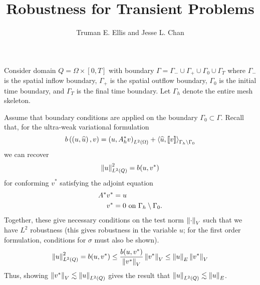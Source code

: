 \documentclass{article}
\title{Robustness for Transient Problems}
\author{Truman E. Ellis and Jesse L. Chan}
\begin{document}
\maketitle

Consider domain $Q=\Omega\times[0,T]$ with boundary $\Gamma=\Gamma_-\cup\Gamma_+\cup\Gamma_0\cup\Gamma_T$ 
where $\Gamma_-$ is the spatial inflow boundary, $\Gamma_+$ is the spatial outflow boundary, $\Gamma_0$ is the initial time boundary, 
and $\Gamma_T$ is the final time boundary. Let $\Gamma_h$ denote the entire mesh skeleton.

Assume that boundary conditions are applied on the boundary $\Gamma_0\subset \Gamma$.  Recall that, for the ultra-weak variational formulation
\[
b\left( \left( u,\widehat{u} \right),v \right) = \left( u,A^*_h v \right)_{L^2\left( \Omega \right)} + \left\langle \widehat{u}, \left[ \![v]\! \right] \right\rangle_{\Gamma_h\setminus \Gamma_0}
\]
we can recover
\[
\left\| u \right\|_{L^2\left( Q \right)}^2 = b(u,v^*)
\]
for conforming $v^*$ satisfying the adjoint equation
\begin{align*}
A^* v^* &= u\\
v^* &= 0 \text{ on } \Gamma_h\setminus\Gamma_0.
\end{align*}
Together, these give necessary conditions on the test norm $\left\| \cdot \right\|_V$ such that we have $L^2$ robustness (this gives robustness in the variable $u$; for the first order formulation, conditions for $\sigma$ must also be shown).  
\[
\left\| u \right\|_{L^2\left( Q \right)}^2 = b(u,v^*) \leq \frac{b(u,v^*)}{\left\| v^* \right\|_V} \left\| v^* \right\|_V \leq \left\| u \right\|_E \left\| v^* \right\|_V
\]
Thus, showing $\left\| v^* \right\|_V \lesssim \left\| u \right\|_{L^2\left( Q \right)}$ gives the result that $\left\| u \right\|_{L^2\left( Q \right)} \lesssim \left\| u \right\|_E$.  



\end{document}
